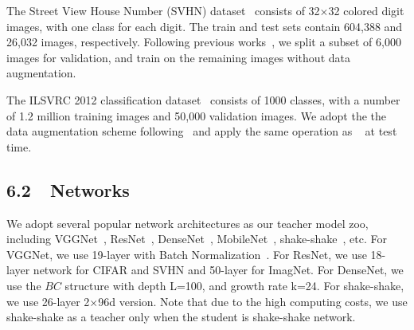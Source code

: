\documentclass[letterpaper]{article} %
\begin{document}
 The Street View House Number (SVHN) dataset~\cite{netzer2011reading} consists of 32$\times$32 colored digit images, with one class for each digit. The train and test sets contain 604,388 and 26,032 images, respectively. Following previous works~\cite{goodfellow2013maxout,huang2016deep,huang2017snapshot,liu2017learning}, we split a subset of 6,000 images for validation, and train on the remaining images without data augmentation.

 The ILSVRC 2012 classification dataset~\cite{deng2009imagenet} consists of 1000 classes, with a number of 1.2 million training images and 50,000 validation images. We adopt the the data augmentation scheme following~\cite{krizhevsky2012imagenet} and apply the same operation as ~\cite{huang2017snapshot} at test time.


\subsection{6.2~~Networks}
We adopt several popular network architectures as our teacher model zoo, including VGGNet~\cite{simonyan2014very}, ResNet~\cite{he2016deep}, DenseNet~\cite{huang2016densely}, MobileNet~\cite{howard2017mobilenets}, shake-shake~\cite{gastaldi2017shake}, etc. For VGGNet, we use 19-layer with Batch Normalization~\cite{ioffe2015batch}. For ResNet, we use 18-layer network for CIFAR and SVHN and 50-layer for ImagNet. For DenseNet, we use the $BC$ structure with depth L=100, and growth rate k=24. For shake-shake, we use 26-layer 2$\times$96d version. Note that due to the high computing costs, we use shake-shake as a teacher only when the student is shake-shake network.
\end{document}
